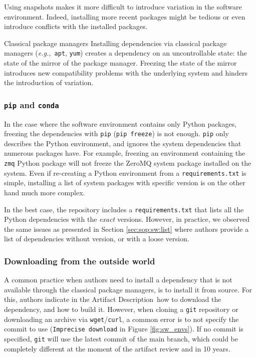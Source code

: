 \documentclass[sigconf,natbib=false]{acmart}
\newcommand{\eg}{\emph{e.g.,}}
\newcommand{\ad}{Artifact Description}
\begin{document}
Using snapshots makes it more difficult to introduce variation in the software environment.
Indeed, installing more recent packages might be tedious or even introduce conflicts with the installed packages.


\begin{lesson}{Classical package managers}{}
  Installing dependencies via classical package managers (\eg\ \texttt{apt}, \texttt{yum}) creates a dependency on an uncontrollable state: the state of the mirror of the package manager.
  Freezing the state of the mirror introduces new compatibility problems with the underlying system and hinders the introduction of variation.
\end{lesson}

\subsubsection{\texttt{pip} and \texttt{conda}}

In the case where the software environment contains only Python packages, freezing the dependencies with \texttt{pip} (\texttt{pip freeze}) is not enough.
\texttt{pip} only describes the Python environment, and ignores the system dependencies that numerous packages have. 
For example, freezing an environment containing the \texttt{zmq} Python package will not freeze the ZeroMQ system package installed on the system.  
Even if re-creating a Python environment from a \texttt{requirements.txt} is simple, installing a list of system packages with specific version is on the other hand much more complex.

In the best case, the repository includes a \texttt{requirements.txt} that lists all the Python dependencies with the \emph{exact} versions.
However, in practice, we observed the same issues as presented in Section \ref{sec:sop:sw:list} where authors provide a list of dependencies without version, or with a loose version.

\subsubsection{Downloading from the outside world}

A common practice when authors need to install a dependency that is not available through the classical package managers, is to install it from source.
For this, authors indicate in the \ad\ how to download the dependency, and how to build it.
However, when cloning a \texttt{git} repository or downloading an archive via \texttt{wget}/\texttt{curl}, a common error is to not specify the commit to use (\texttt{Imprecise download} in Figure \ref{fig:sw_envs}).
If no commit is specified, \texttt{git} will use the latest commit of the main branch, which could be completely different at the moment of the artifact review and in 10 years.
\end{document}
